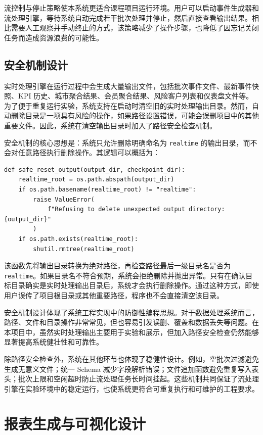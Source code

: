 \documentclass[12pt,hyperref,a4paper,UTF8]{ctexart}
\begin{document}
流控制与停止策略使本系统更适合课程项目运行环境。用户可以启动事件生成器和流处理引擎，等待系统自动完成若干批次处理并停止，然后直接查看输出结果。相比需要人工观察并手动终止的方式，该策略减少了操作步骤，也降低了因忘记关闭任务而造成资源浪费的可能性。

\subsection{安全机制设计}

实时处理引擎在运行过程中会生成大量输出文件，包括批次事件文件、最新事件快照、KPI 历史、城市聚合结果、会员聚合结果、风险客户列表和仪表盘文件等。为了便于重复运行实验，系统支持在启动时清空旧的实时处理输出目录。然而，自动删除目录是一项具有风险的操作，如果路径设置错误，可能会误删项目中的其他重要文件。因此，系统在清空输出目录时加入了路径安全检查机制。

安全机制的核心思想是：系统只允许删除明确命名为 \texttt{realtime} 的输出目录，而不会对任意路径执行删除操作。其逻辑可以概括为：

\begin{verbatim}
def safe_reset_output(output_dir, checkpoint_dir):
    realtime_root = os.path.abspath(output_dir)
    if os.path.basename(realtime_root) != "realtime":
        raise ValueError(
            f"Refusing to delete unexpected output directory: {output_dir}"
        )
    if os.path.exists(realtime_root):
        shutil.rmtree(realtime_root)
\end{verbatim}

该函数先将输出目录转换为绝对路径，再检查路径最后一级目录名是否为 \texttt{realtime}。如果目录名不符合预期，系统会拒绝删除并抛出异常。只有在确认目标目录确实是实时处理输出目录后，系统才会执行删除操作。通过这种方式，即使用户误传了项目根目录或其他重要路径，程序也不会直接清空该目录。

安全机制设计体现了系统工程实现中的防御性编程思想。对于数据处理系统而言，路径、文件和目录操作非常常见，但也容易引发误删、覆盖和数据丢失等问题。在本项目中，虽然实时处理输出主要用于实验和展示，但加入路径安全检查仍然能够显著提高系统健壮性和可靠性。

除路径安全检查外，系统在其他环节也体现了稳健性设计。例如，空批次过滤避免生成无意义文件；统一 Schema 减少字段解析错误；文件追加函数避免重复写入表头；批次上限和空闲超时防止流处理任务长时间挂起。这些机制共同保证了流处理引擎在实验环境中的稳定运行，也使系统更符合可重复执行和可维护的工程要求。

\section{报表生成与可视化设计}
\end{document}
